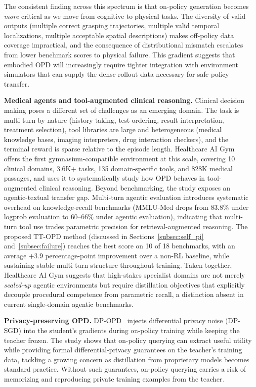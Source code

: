 \documentclass{article} %
\begin{document}
The consistent finding across this spectrum is that on-policy generation becomes \emph{more} critical as we move from cognitive to physical tasks. The diversity of valid outputs (multiple correct grasping trajectories, multiple valid temporal localizations, multiple acceptable spatial descriptions) makes off-policy data coverage impractical, and the consequence of distributional mismatch escalates from lower benchmark scores to physical failure. This gradient suggests that embodied OPD will increasingly require tighter integration with environment simulators that can supply the dense rollout data necessary for safe policy transfer.

\textbf{Medical agents and tool-augmented clinical reasoning.} Clinical decision making poses a different set of challenges as an emerging domain. The task is multi-turn by nature (history taking, test ordering, result interpretation, treatment selection), tool libraries are large and heterogeneous (medical knowledge bases, imaging interpreters, drug interaction checkers), and the terminal reward is sparse relative to the episode length. Healthcare AI Gym~\citep{ttopd2026} offers the first gymnasium-compatible environment at this scale, covering 10 clinical domains, 3.6K+ tasks, 135 domain-specific tools, and 828K medical passages, and uses it to systematically study how OPD behaves in tool-augmented clinical reasoning. Beyond benchmarking, the study exposes an agentic-textual transfer gap. Multi-turn agentic evaluation introduces systematic overhead on knowledge-recall benchmarks (MMLU-Med drops from 83.8\% under logprob evaluation to 60--66\% under agentic evaluation), indicating that multi-turn tool use trades parametric precision for retrieval-augmented reasoning. The proposed TT-OPD method (discussed in Sections~\ref{subsec:self_pi} and~\ref{subsec:failure}) reaches the best score on 10 of 18 benchmarks, with an average $+3.9$ percentage-point improvement over a non-RL baseline, while sustaining stable multi-turn structure throughout training. Taken together, Healthcare AI Gym suggests that high-stakes specialist domains are not merely \emph{scaled-up} agentic environments but require distillation objectives that explicitly decouple procedural competence from parametric recall, a distinction absent in current single-domain agentic benchmarks.

\textbf{Privacy-preserving OPD.} DP-OPD~\citep{khadem2026dpopd} injects differential privacy noise (DP-SGD) into the student's gradients during on-policy training while keeping the teacher frozen. The study shows that on-policy querying can extract useful utility while providing formal differential-privacy guarantees on the teacher's training data, tackling a growing concern as distillation from proprietary models becomes standard practice. Without such guarantees, on-policy querying carries a risk of memorizing and reproducing private training examples from the teacher.
\end{document}

